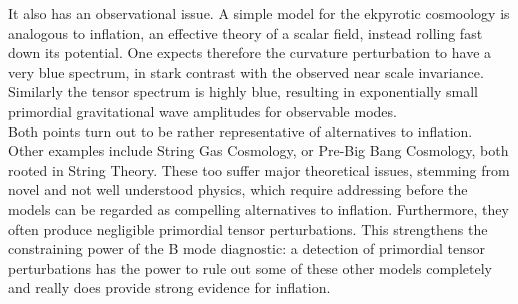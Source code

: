 \documentclass[a4paper,10pt]{article}
\begin{document}
It also has an observational issue. A simple model for the ekpyrotic cosmoology is analogous to inflation, an effective theory of a scalar field, instead rolling fast down its potential. One expects therefore the curvature perturbation to have a very blue spectrum, in stark contrast with the observed near scale invariance. Similarly the tensor spectrum is highly blue, resulting in exponentially small primordial gravitational wave amplitudes for observable modes. \\

Both points turn out to be rather representative of alternatives to inflation. Other examples include String Gas Cosmology, or Pre-Big Bang Cosmology, both rooted in String Theory. These too suffer major theoretical issues, stemming from novel and not well understood physics, which require addressing before the models can be regarded as compelling alternatives to inflation. Furthermore, they often produce negligible primordial tensor perturbations. This strengthens the constraining power of the B mode diagnostic: a detection of primordial tensor perturbations has the power to rule out some of these other models completely and really does provide strong evidence for inflation.



\end{document}
